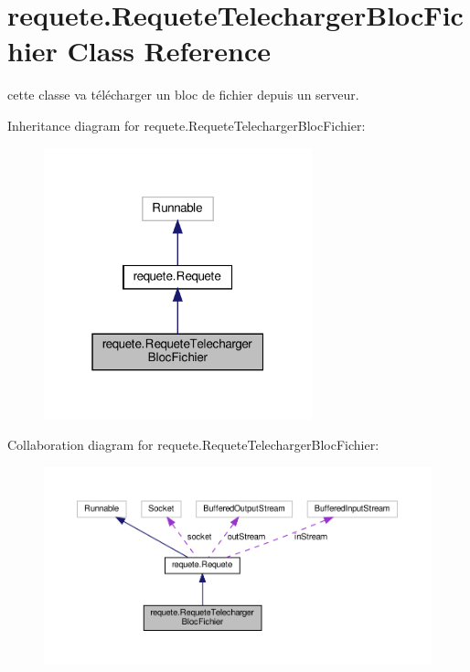\hypertarget{classrequete_1_1RequeteTelechargerBlocFichier}{}\section{requete.\+Requete\+Telecharger\+Bloc\+Fichier Class Reference}
\label{classrequete_1_1RequeteTelechargerBlocFichier}


cette classe va télécharger un bloc de fichier depuis un serveur.  




Inheritance diagram for requete.\+Requete\+Telecharger\+Bloc\+Fichier\+:\nopagebreak
\begin{figure}[H]
\begin{center}
\leavevmode
\includegraphics[width=220pt]{classrequete_1_1RequeteTelechargerBlocFichier__inherit__graph}
\end{center}
\end{figure}


Collaboration diagram for requete.\+Requete\+Telecharger\+Bloc\+Fichier\+:\nopagebreak
\begin{figure}[H]
\begin{center}
\leavevmode
\includegraphics[width=350pt]{classrequete_1_1RequeteTelechargerBlocFichier__coll__graph}
\end{center}
\end{figure}
